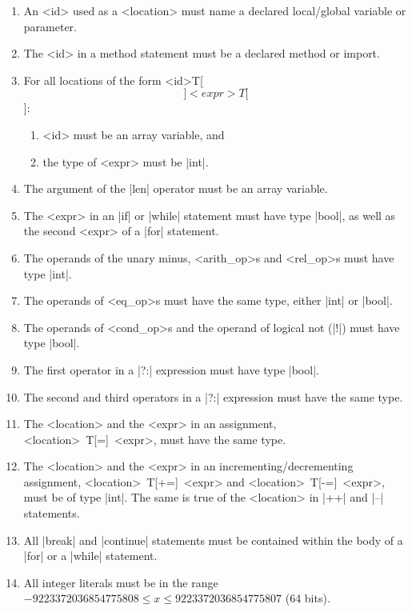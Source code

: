 \documentclass[11pt]{article}
\begin{document}
\begin{enumerate}
\item An {\bnf <id>} used as a {\bnf <location>} must name a declared local/global variable or parameter.
\item The {\bnf <id>} in a method statement must be a declared method or import.
\item For all locations of the form {\bnf <id>T[\[]<expr>T[\]]}:
      \begin{enumerate}
      \item {\bnf <id>} must be an array variable, and
      \item the type of {\bnf <expr>} must be \decaf|int|.
      \end{enumerate}
\item The argument of the \decaf|len| operator must be an array variable.
\item The {\bnf <expr>} in an \decaf|if| or \decaf|while| statement must have type \decaf|bool|, as well as the second {\bnf <expr>} of a \decaf|for| statement.
\item The operands of the unary minus, {\bnf <arith_op>}s and {\bnf <rel_op>}s must have type \decaf|int|.
\item The operands of {\bnf <eq_op>}s must have the same type, either \decaf|int| or \decaf|bool|.
\item The operands of {\bnf <cond_op>}s and the operand of logical not (\decaf|!|) must have type \decaf|bool|.
\item The first operator in a \decaf|?:| expression must have type \decaf|bool|.
\item The second and third operators in a \decaf|?:| expression must have the same type.
\item The {\bnf <location>} and the {\bnf <expr>} in an assignment, {\bnf <location>~T[=]~<expr>}, must have the same type.
\item The {\bnf <location>} and the {\bnf <expr>} in an incrementing/decrementing assignment, {\bnf <location>~T[+=]~<expr>} and {\bnf <location>~T[-=]~<expr>}, must be of type \decaf|int|.
  The same is true of the {\bnf <location>} in \decaf|++| and \decaf|--| statements.
\item All \decaf|break| and \decaf|continue| statements must be contained within the body of a \decaf|for| or a \decaf|while| statement.
\item All integer literals must be in the range $-9223372036854775808 \leq x \leq 9223372036854775807$ (64 bits).
\end{enumerate}
\end{document}
